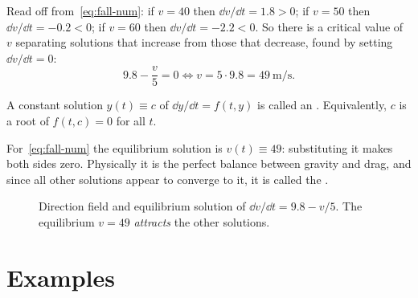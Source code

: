 \begin{eg}
	Read off from~\eqref{eq:fall-num}: if \(v = 40\) then \(\dd v/\dd t = 1.8 > 0\); if
	\(v = 50\) then \(\dd v/\dd t = -0.2 < 0\); if \(v = 60\) then \(\dd v/\dd t = -2.2 <
	0\). So there is a critical value of \(v\) separating solutions that increase from
	those that decrease, found by setting \(\dd v/\dd t = 0\):
	\[
		9.8 - \frac{v}{5} = 0 \iff v = 5 \cdot 9.8 = \SI{49}{\metre\per\second}.
	\]
\end{eg}

\begin{definition}
	A constant solution \(y(t) \equiv c\) of \(\dd y/\dd t = f(t,y)\) is called an
	. Equivalently, \(c\) is a root of \(f(t, c) = 0\)
	for all \(t\).
\end{definition}

For~\eqref{eq:fall-num} the equilibrium solution is \(v(t) \equiv 49\): substituting it
makes both sides zero. Physically it is the perfect balance between gravity and drag, and
since all other solutions appear to converge to it, it is called the .

\begin{figure}[H]
	\centering
	\caption{Direction field and equilibrium solution of
		\(\dd v/\dd t = 9.8 - v/5\). The equilibrium \(v = 49\) \emph{attracts} the
		other solutions.}
	\label{fig:dirfield-fall}
\end{figure}

\section{Examples}


